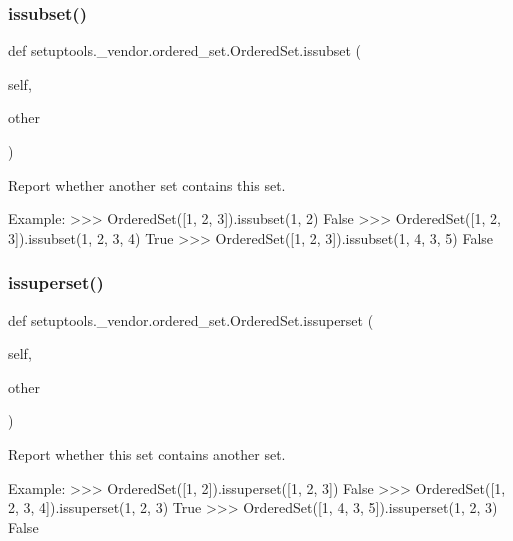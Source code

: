 \subsubsection{\texorpdfstring{issubset()}{issubset()}}
{\footnotesize\ttfamily def setuptools.\+\_\+vendor.\+ordered\+\_\+set.\+Ordered\+Set.\+issubset (\begin{DoxyParamCaption}\item[{}]{self,  }\item[{}]{other }\end{DoxyParamCaption})}

\begin{DoxyVerb}Report whether another set contains this set.

Example:
    >>> OrderedSet([1, 2, 3]).issubset({1, 2})
    False
    >>> OrderedSet([1, 2, 3]).issubset({1, 2, 3, 4})
    True
    >>> OrderedSet([1, 2, 3]).issubset({1, 4, 3, 5})
    False
\end{DoxyVerb}
 \mbox{\label{classsetuptools_1_1__vendor_1_1ordered__set_1_1OrderedSet_a94aaf3157a0f86ffa965571f21b13147}} 
\subsubsection{\texorpdfstring{issuperset()}{issuperset()}}
{\footnotesize\ttfamily def setuptools.\+\_\+vendor.\+ordered\+\_\+set.\+Ordered\+Set.\+issuperset (\begin{DoxyParamCaption}\item[{}]{self,  }\item[{}]{other }\end{DoxyParamCaption})}

\begin{DoxyVerb}Report whether this set contains another set.

Example:
    >>> OrderedSet([1, 2]).issuperset([1, 2, 3])
    False
    >>> OrderedSet([1, 2, 3, 4]).issuperset({1, 2, 3})
    True
    >>> OrderedSet([1, 4, 3, 5]).issuperset({1, 2, 3})
    False
\end{DoxyVerb}
 \mbox{\label{classsetuptools_1_1__vendor_1_1ordered__set_1_1OrderedSet_a2c082ff6ec71d46b9bfc294323720611}} 
